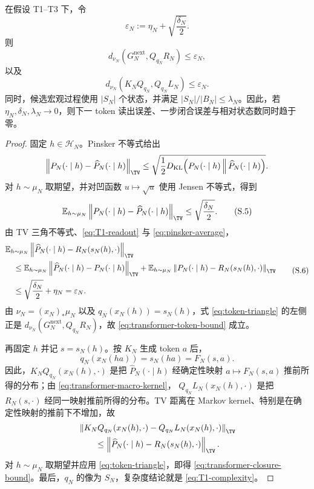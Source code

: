\begin{theorem}[自回归预测状态的分布加权闭合]
\label{thm:transformer-weighted-closure}
在假设 \textup{T1--T3} 下，令
\[
 \varepsilon_N:=\eta_N+\sqrt{\frac{\delta_N}{2}}.
 \tag{S.2}\label{eq:transformer-epsilon}
\]
则
\[
 d_{\nu_N}\!\left(
 G_N^{\mathrm{next}},Q_{q_N}R_N
 \right)\le\varepsilon_N,
 \tag{S.3}\label{eq:transformer-token-bound}
\]
以及
\[
 d_{\nu_N}\!\left(
 K_NQ_{q_N},Q_{q_N}L_N
 \right)\le\varepsilon_N.
 \tag{S.4}\label{eq:transformer-closure-bound}
\]
同时，候选宏观过程使用 $|S_N|$ 个状态，并满足
$|S_N|/|B_N|\le\lambda_N$。因此，若
$\eta_N,\delta_N,\lambda_N\to0$，则下一 token 读出误差、一步闭合误差与相对状态数同时趋于零。
\end{theorem}

\begin{proof}
固定 $h\in\mathcal H_N$。Pinsker 不等式给出
\[
 \left\|P_N(\cdot\mid h)-\widehat P_N(\cdot\mid h)\right\|_{\TV}
 \le
 \sqrt{\frac12
 D_{\mathrm{KL}}\!\left(
 P_N(\cdot\mid h)\,\middle\|\,
 \widehat P_N(\cdot\mid h)
 \right)}.
\]
对 $h\sim\mu_N$ 取期望，并对凹函数 $u\mapsto\sqrt u$ 使用 Jensen 不等式，得到
\[
 \mathbb E_{h\sim\mu_N}
 \left\|P_N(\cdot\mid h)-\widehat P_N(\cdot\mid h)\right\|_{\TV}
 \le\sqrt{\frac{\delta_N}{2}}.
 \tag{S.5}\label{eq:pinsker-average}
\]
由 TV 三角不等式、\eqref{eq:T1-readout} 与
\eqref{eq:pinsker-average}，
\[
 \begin{aligned}
 &\mathbb E_{h\sim\mu_N}
 \left\|\widehat P_N(\cdot\mid h)
       -R_N(s_N(h),\cdot)\right\|_{\TV}\\
 &\quad\le
 \mathbb E_{h\sim\mu_N}
 \left\|\widehat P_N(\cdot\mid h)-P_N(\cdot\mid h)\right\|_{\TV}
 +\mathbb E_{h\sim\mu_N}
 \left\|P_N(\cdot\mid h)-R_N(s_N(h),\cdot)\right\|_{\TV}\\
 &\quad\le\sqrt{\frac{\delta_N}{2}}+\eta_N
 =\varepsilon_N.
 \end{aligned}
 \tag{S.6}\label{eq:token-triangle}
\]
由 $\nu_N=(x_N)_*\mu_N$ 以及
$q_N(x_N(h))=s_N(h)$，式 \eqref{eq:token-triangle} 的左侧正是
$d_{\nu_N}(G_N^{\mathrm{next}},Q_{q_N}R_N)$，故
\eqref{eq:transformer-token-bound} 成立。

再固定 $h$ 并记 $s=s_N(h)$。按 $K_N$ 生成 token $a$ 后，
\[
 q_N(x_N(ha))=s_N(ha)=F_N(s,a).
\]
因此，$K_NQ_{q_N}(x_N(h),\cdot)$ 是把
$\widehat P_N(\cdot\mid h)$ 经确定性映射
$a\mapsto F_N(s,a)$ 推前所得的分布；由
\eqref{eq:transformer-macro-kernel}，
$Q_{q_N}L_N(x_N(h),\cdot)$ 是把
$R_N(s,\cdot)$ 经同一映射推前所得的分布。TV 距离在 Markov kernel、特别是在确定性映射的推前下不增加，故
\[
 \begin{aligned}
 &\left\|K_NQ_{q_N}(x_N(h),\cdot)
       -Q_{q_N}L_N(x_N(h),\cdot)\right\|_{\TV}\\
 &\qquad\le
 \left\|\widehat P_N(\cdot\mid h)
       -R_N(s_N(h),\cdot)\right\|_{\TV}.
 \end{aligned}
\]
对 $h\sim\mu_N$ 取期望并应用 \eqref{eq:token-triangle}，即得
\eqref{eq:transformer-closure-bound}。最后，$q_N$ 的像为 $S_N$，复杂度结论就是 \eqref{eq:T1-complexity}。
\end{proof}

